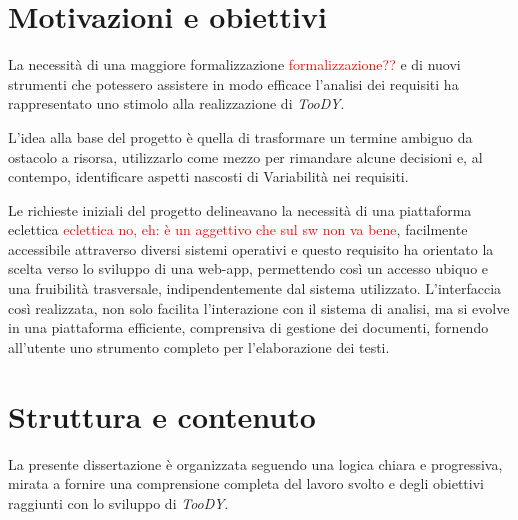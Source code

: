 \documentclass[12pt]{report}
\newcommand{\torevise}[1]{\textcolor{red}{#1}}
\newcommand{\toody}{\textsl{TooDY}\xspace}
\begin{document}
\section{Motivazioni e obiettivi}
La necessità di una maggiore formalizzazione \torevise{formalizzazione??} e di nuovi strumenti che potessero assistere in modo efficace l'analisi dei requisiti ha rappresentato uno stimolo alla realizzazione di \toody.

L’idea alla base del progetto è quella di trasformare un termine ambiguo da ostacolo a risorsa, utilizzarlo come mezzo per rimandare alcune decisioni e, al contempo, identificare aspetti nascosti di Variabilità nei requisiti.

Le richieste iniziali del progetto delineavano la necessità di una piattaforma eclettica \torevise{eclettica no, eh: è un aggettivo che sul sw non va bene}, facilmente accessibile attraverso diversi sistemi operativi e questo requisito ha orientato la scelta verso lo sviluppo di una web-app, permettendo così un accesso ubiquo e una fruibilità trasversale, indipendentemente dal sistema utilizzato. L'interfaccia così realizzata, non solo facilita l'interazione con il sistema di analisi, ma si evolve in una piattaforma efficiente, comprensiva di gestione dei documenti, fornendo all'utente uno strumento completo per l'elaborazione dei testi.


\section{Struttura e contenuto}
La presente dissertazione è organizzata seguendo una logica chiara e progressiva, mirata a fornire una comprensione completa del lavoro svolto e degli obiettivi raggiunti con lo sviluppo di \toody.

\end{document}
